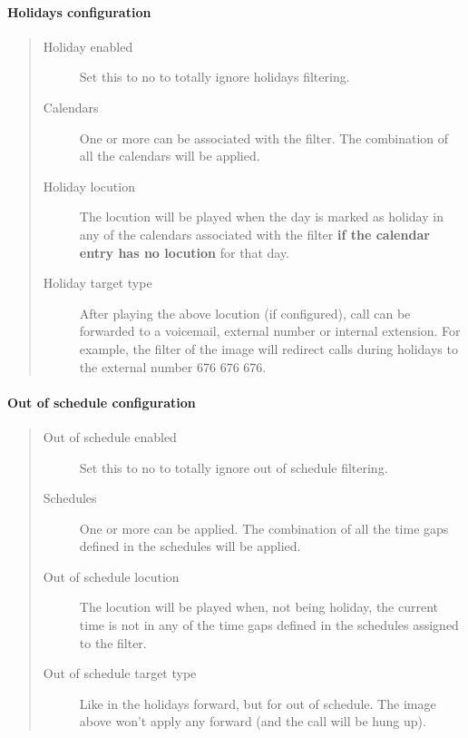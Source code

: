 \documentclass[letterpaper,10pt,english]{sphinxmanual}
\begin{document}
\paragraph{Holidays configuration}
\label{administration_portal/client/vpbx/routing_tools/external_call_filters:holidays-configuration}\begin{quote}
\begin{description}
\item[{Holiday enabled}] \leavevmode
Set this to no to totally ignore holidays filtering.

\item[{Calendars}] \leavevmode
One or more {\hyperref[administration_portal/client/vpbx/routing_tools/calendars:calendars]{}} can be associated with the filter. The combination
of all the calendars will be applied.

\item[{Holiday locution}] \leavevmode
The locution will be  played when the day is marked as holiday in any
of the calendars associated with the filter \textbf{if the calendar entry has
no locution} for that day.

\item[{Holiday target type}] \leavevmode
After playing the above locution (if configured), call can be forwarded
to a voicemail, external number or internal extension. For example, the
filter of the image will redirect calls during holidays to the external
number 676 676 676.

\end{description}
\end{quote}


\paragraph{Out of schedule configuration}
\label{administration_portal/client/vpbx/routing_tools/external_call_filters:out-of-schedule-configuration}\begin{quote}
\begin{description}
\item[{Out of schedule enabled}] \leavevmode
Set this to no to totally ignore out of schedule filtering.

\item[{Schedules}] \leavevmode
One or more {\hyperref[administration_portal/client/vpbx/routing_tools/schedules:schedules]{}} can be applied. The combination of all the time
gaps defined in the schedules will be applied.

\item[{Out of schedule locution}] \leavevmode
The locution will be played when, not being holiday, the current time
is not in any of the time gaps defined in the schedules assigned to the
filter.

\item[{Out of schedule target type}] \leavevmode
Like in the holidays forward, but for out of schedule. The image above
won't apply any forward (and the call will be hung up).

\end{description}
\end{quote}
\end{document}
